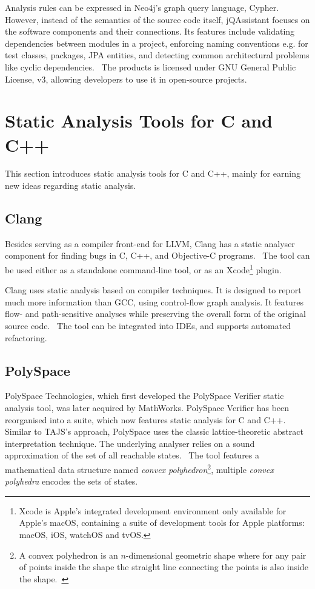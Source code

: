 Analysis rules can be expressed in Neo4j's graph query language, Cypher. However, instead of the semantics of the source code itself, jQAssistant focuses on the software components and their connections. Its features include validating dependencies between modules in a project, enforcing naming conventions e.g. for test classes, packages, JPA entities, and detecting common architectural problems like cyclic dependencies.~\cite{jqassistant-documentation} The products is licensed under GNU General Public License, v3, allowing developers to use it in open-source projects.~\cite{gplv3}


\section{Static Analysis Tools for C and C++}

This section introduces static analysis tools for C and C++, mainly for earning new ideas regarding static analysis.


\subsection{Clang}

Besides serving as a compiler front-end for LLVM, Clang has a static analyser component for finding bugs in C, C++, and Objective-C programs.~\cite{clang-analyser-website} The tool can be used either as a standalone command-line tool, or as an Xcode\footnote{Xcode is Apple's integrated development environment only available for Apple's macOS, containing a suite of development tools for Apple platforms: macOS, iOS, watchOS and tvOS.} plugin.

Clang uses static analysis based on compiler techniques. It is designed to report much more information than GCC, using control-flow graph analysis. It features flow- and path-sensitive analyses while preserving the overall form of the original source code.~\cite{kremenek2008finding} The tool can be integrated into IDEs, and supports automated refactoring.


\subsection{PolySpace}

PolySpace Technologies, which first developed the PolySpace Verifier static analysis tool, was later acquired by MathWorks. PolySpace Verifier has been reorganised into a suite, which now features static analysis for C and C++. Similar to TAJS's approach, PolySpace uses the classic lattice-theoretic abstract interpretation technique. The underlying analyser relies on a sound approximation of the set of all reachable states.~\cite{emanuelsson2008comparative} The tool features a mathematical data structure named \emph{convex polyhedron}\footnote{A convex polyhedron is an $n$-dimensional geometric shape where for any pair of points inside the shape the straight line connecting the points is also inside the shape.~\cite{emanuelsson2008comparative}}, multiple \emph{convex polyhedra} encodes the sets of states.~\cite{cousot1978automatic}

